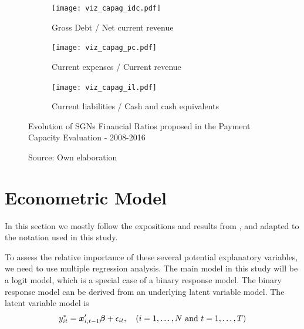 \begin{figure}[!ht]
\centering
\begin{subfigure}{.5\textwidth}
  \centering
  \texttt{[image: viz\_capag\_idc.pdf]}
  \caption{Gross Debt / Net current revenue}
  \label{fig:capag_pc}
\end{subfigure}%
\begin{subfigure}{.5\textwidth}
  \centering
  \texttt{[image: viz\_capag\_pc.pdf]}
  \caption{Current expenses / Current revenue}
  \label{fig:capag_il}
\end{subfigure}

\begin{subfigure}{\textwidth}
  \centering
  \texttt{[image: viz\_capag\_il.pdf]}
  \caption{Current liabilities / Cash and cash equivalents}
  \label{fig:capag_idc}
\end{subfigure}%

\caption{Evolution of SGNs Financial Ratios proposed in the Payment Capacity Evaluation - 2008-2016}
\label{fig:evolution_capag}
\caption*{Source: Own elaboration}
\end{figure}

\clearpage

\section{Econometric Model}
\label{sec:econometric-model}

In this section we mostly follow the expositions and results from \citet{greene2011}, \citet{heij2004} and \citet{davidson2004} adapted to the notation used in this study. 

To assess the relative importance of these several potential explanatory variables, we need to use multiple regression analysis. The main model in this study will be a logit model, which is a special case of a binary response model. The binary response model can be derived from an underlying latent variable model. The latent variable model is
\begin{equation}
y^*_{it} = \bm x'_{i,t-1}\bm \beta + \epsilon_{it}, \quad (i = 1, \dots, N \text{ and } t = 1, \dots, T)
\end{equation}

